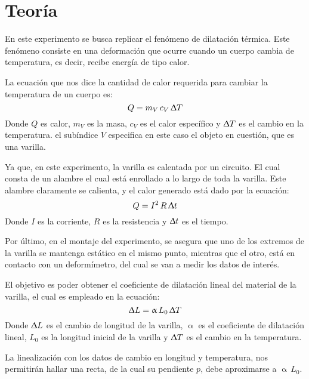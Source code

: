 \section{Teoría}

En este experimento se busca replicar el fenómeno de dilatación térmica.
Este fenómeno consiste en una deformación que ocurre cuando un cuerpo
cambia de temperatura, es decir, recibe energía de tipo calor.

La ecuación que nos dice la cantidad de calor requerida para cambiar la
temperatura de un cuerpo es:
\[Q = m_V\,c_V\,\Updelta T\]
Donde $Q$ es calor, $m_V$ es la masa, $c_V$ es el calor específico y
$\Updelta T$ es el cambio en la temperatura. el subíndice $V$ especifica
en este caso el objeto en cuestión, que es una varilla.

Ya que, en este experimento, la varilla es calentada por un circuito. El
cual consta de un alambre el cual está enrollado a lo largo de toda la
varilla. Este alambre claramente se calienta, y el calor generado está dado
por la ecuación:
\[Q = I^2\,R\,\Updelta t\]
Donde $I$ es la corriente, $R$ es la resistencia y $\Updelta t$ es el tiempo.

Por último, en el montaje del experimento, se asegura que uno de los extremos
de la varilla se mantenga estático en el mismo punto, mientras que el otro,
está en contacto con un deformímetro, del cual se van a medir los datos de
interés.

El objetivo es poder obtener el coeficiente de dilatación lineal del material
de la varilla, el cual es empleado en la ecuación:
\[\Updelta L = \upalpha\,L_0\,\Updelta T\]
Donde $\Updelta L$ es el cambio de longitud de la varilla, $\upalpha$ es el
coeficiente de dilatación lineal, $L_0$ es la longitud inicial de la varilla
y $\Updelta T$ es el cambio en la temperatura.

La linealización con los datos de cambio en longitud y temperatura, nos
permitirán hallar una recta, de la cual su pendiente $p$, debe aproximarse a $\upalpha\,L_0$.